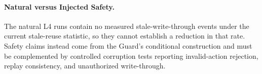 \paragraph{Natural versus Injected Safety.}
The natural L4 runs contain no measured stale-write-through events under the current stale-reuse statistic, so they cannot establish a reduction in that rate. Safety claims instead come from the Guard's conditional construction and must be complemented by controlled corruption tests reporting invalid-action rejection, replay consistency, and unauthorized write-through.
